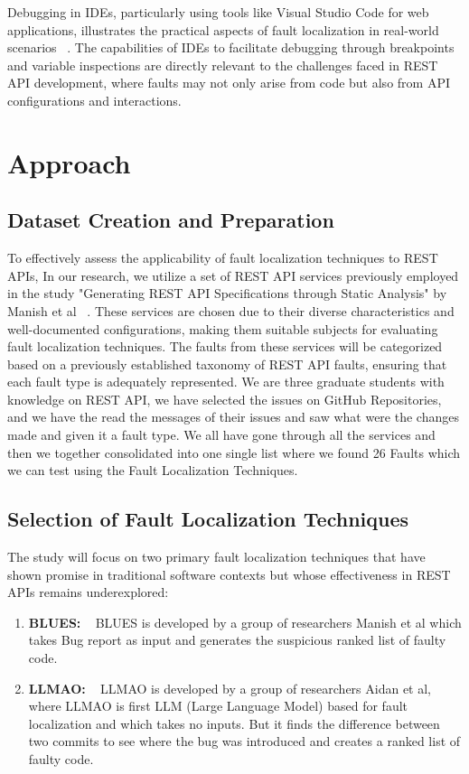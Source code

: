 \documentclass[conference]{IEEEtran}
\begin{document}
Debugging in IDEs, particularly using tools like Visual Studio Code for web applications, illustrates the practical aspects of fault localization in real-world scenarios ~\cite{DebuggingCode}. The capabilities of IDEs to facilitate debugging through breakpoints and variable inspections are directly relevant to the challenges faced in REST API development, where faults may not only arise from code but also from API configurations and interactions.


\section{Approach}
\label{sec:approach}

\subsection{Dataset Creation and Preparation}

To effectively assess the applicability of fault localization techniques to REST APIs, In our research, we utilize a set of REST API services previously employed in the study "Generating REST API Specifications through Static Analysis" by Manish et al ~\cite{ManishRestServices}. These services are chosen due to their diverse characteristics and well-documented configurations, making them suitable subjects for evaluating fault localization techniques. 
The faults from these services will be categorized based on a previously established taxonomy of REST API faults, ensuring that each fault type is adequately represented. We are three graduate students with knowledge on REST API, we have selected the issues on GitHub Repositories, and we have the read the messages of their issues and saw what were the changes made and given it a fault type. We all have gone through all the services and then we together consolidated into one single list where we found 26 Faults which we can test using the Fault Localization Techniques. 

\subsection{Selection of Fault Localization Techniques}

The study will focus on two primary fault localization techniques that have shown promise in traditional software contexts but whose effectiveness in REST APIs remains underexplored:
\begin{enumerate}
    \item \textbf{BLUES:} ~\cite{ManishBluesFaultLocalization} BLUES is developed by a group of researchers Manish et al which takes Bug report as input and generates the suspicious ranked list of faulty code.
    \item \textbf{LLMAO:} ~\cite{LLMAOFaultLocalization} LLMAO is developed by a group of researchers Aidan et al, where LLMAO is first LLM (Large Language Model) based for fault localization and which takes no inputs. But it finds the difference between two commits to see where the bug was introduced and creates a ranked list of faulty code. 

\end{enumerate}
\end{document}
